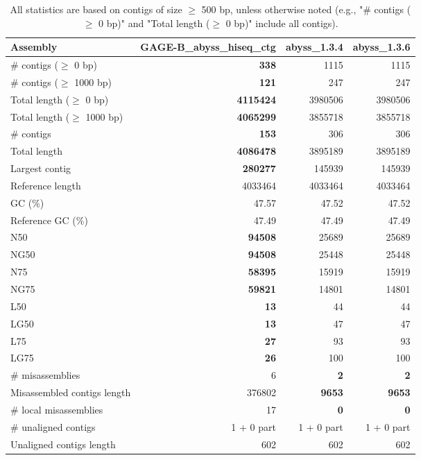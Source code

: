 \documentclass[12pt,a4paper]{article}
\begin{document}
\begin{table}[ht]
\begin{center}
\caption{All statistics are based on contigs of size $\geq$ 500 bp, unless otherwise noted (e.g., "\# contigs ($\geq$ 0 bp)" and "Total length ($\geq$ 0 bp)" include all contigs).}
\begin{tabular}{|l*{3}{|r}|}
\hline
Assembly & GAGE-B\_abyss\_hiseq\_ctg & abyss\_1.3.4 & abyss\_1.3.6 \\ \hline
\# contigs ($\geq$ 0 bp) & {\bf 338} & 1115 & 1115 \\ \hline
\# contigs ($\geq$ 1000 bp) & {\bf 121} & 247 & 247 \\ \hline
Total length ($\geq$ 0 bp) & {\bf 4115424} & 3980506 & 3980506 \\ \hline
Total length ($\geq$ 1000 bp) & {\bf 4065299} & 3855718 & 3855718 \\ \hline
\# contigs & {\bf 153} & 306 & 306 \\ \hline
Total length & {\bf 4086478} & 3895189 & 3895189 \\ \hline
Largest contig & {\bf 280277} & 145939 & 145939 \\ \hline
Reference length & 4033464 & 4033464 & 4033464 \\ \hline
GC (\%) & 47.57 & 47.52 & 47.52 \\ \hline
Reference GC (\%) & 47.49 & 47.49 & 47.49 \\ \hline
N50 & {\bf 94508} & 25689 & 25689 \\ \hline
NG50 & {\bf 94508} & 25448 & 25448 \\ \hline
N75 & {\bf 58395} & 15919 & 15919 \\ \hline
NG75 & {\bf 59821} & 14801 & 14801 \\ \hline
L50 & {\bf 13} & 44 & 44 \\ \hline
LG50 & {\bf 13} & 47 & 47 \\ \hline
L75 & {\bf 27} & 93 & 93 \\ \hline
LG75 & {\bf 26} & 100 & 100 \\ \hline
\# misassemblies & 6 & {\bf 2} & {\bf 2} \\ \hline
Misassembled contigs length & 376802 & {\bf 9653} & {\bf 9653} \\ \hline
\# local misassemblies & 17 & {\bf 0} & {\bf 0} \\ \hline
\# unaligned contigs & 1 + 0 part & 1 + 0 part & 1 + 0 part \\ \hline
Unaligned contigs length & 602 & 602 & 602 \\ \hline

\end{tabular}
\end{center}
\end{table}
\end{document}
